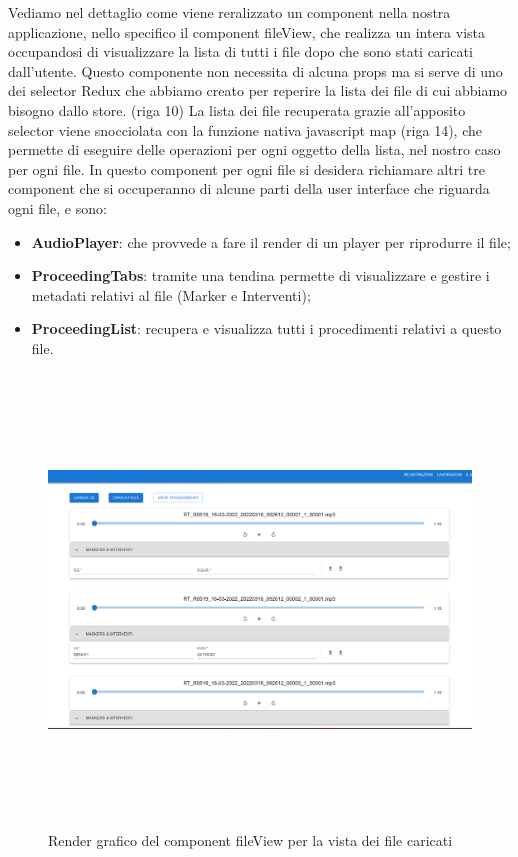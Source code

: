 Vediamo nel dettaglio come viene reralizzato un component nella nostra applicazione, nello specifico il component fileView, che realizza un intera vista occupandosi di visualizzare
la lista di tutti i file dopo che sono stati caricati dall'utente.
Questo componente non necessita di alcuna props ma si serve di uno dei selector Redux che abbiamo creato per reperire la lista dei file di cui abbiamo bisogno dallo store. (riga 10)
La lista dei file recuperata grazie all'apposito selector viene snocciolata con la funzione nativa javascript map (riga 14), che permette di eseguire delle operazioni per ogni
oggetto della lista, nel nostro caso per ogni file. In questo component per ogni file si desidera richiamare altri tre component che si occuperanno di alcune parti
della user interface che riguarda ogni file, e sono:
\begin{itemize}
  \item \textbf{AudioPlayer}: che provvede a fare il render di un player per riprodurre il file;
  \item \textbf{ProceedingTabs}: tramite una tendina permette di visualizzare e gestire i metadati relativi al file (Marker e Interventi);
  \item \textbf{ProceedingList}: recupera e visualizza tutti i procedimenti relativi a questo file.
\end{itemize}

\newpage

\begin{figure}[H]
  \centering
  \includegraphics[width=\textwidth,height=12cm]{immagini/fileView-render.png}
  \caption{Render grafico del component fileView per la vista dei file caricati}
\end{figure}

